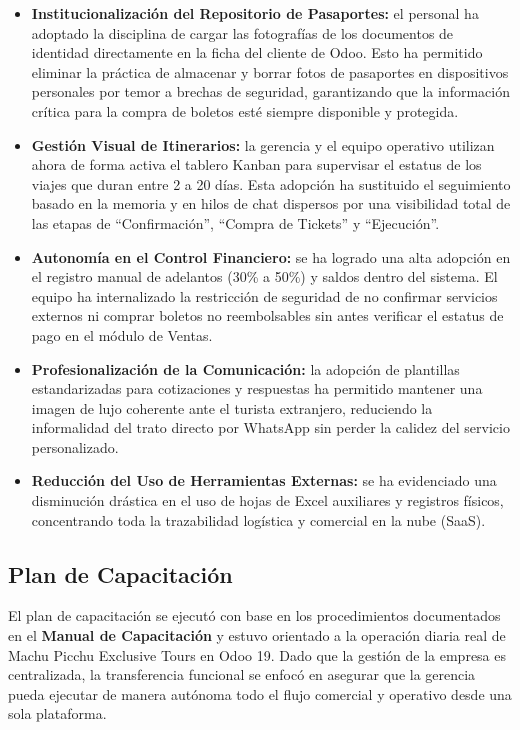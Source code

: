 \begin{itemize}
    \item \textbf{Institucionalización del Repositorio de Pasaportes:} el personal ha adoptado la disciplina de cargar las fotografías de los documentos de identidad directamente en la ficha del cliente de Odoo. Esto ha permitido eliminar la práctica de almacenar y borrar fotos de pasaportes en dispositivos personales por temor a brechas de seguridad, garantizando que la información crítica para la compra de boletos esté siempre disponible y protegida.
    \item \textbf{Gestión Visual de Itinerarios:} la gerencia y el equipo operativo utilizan ahora de forma activa el tablero Kanban para supervisar el estatus de los viajes que duran entre 2 a 20 días. Esta adopción ha sustituido el seguimiento basado en la memoria y en hilos de chat dispersos por una visibilidad total de las etapas de ``Confirmación'', ``Compra de Tickets'' y ``Ejecución''.
    \item \textbf{Autonomía en el Control Financiero:} se ha logrado una alta adopción en el registro manual de adelantos (30\% a 50\%) y saldos dentro del sistema. El equipo ha internalizado la restricción de seguridad de no confirmar servicios externos ni comprar boletos no reembolsables sin antes verificar el estatus de pago en el módulo de Ventas.
    \item \textbf{Profesionalización de la Comunicación:} la adopción de plantillas estandarizadas para cotizaciones y respuestas ha permitido mantener una imagen de lujo coherente ante el turista extranjero, reduciendo la informalidad del trato directo por WhatsApp sin perder la calidez del servicio personalizado.
    \item \textbf{Reducción del Uso de Herramientas Externas:} se ha evidenciado una disminución drástica en el uso de hojas de Excel auxiliares y registros físicos, concentrando toda la trazabilidad logística y comercial en la nube (SaaS).
\end{itemize}

\subsection{Plan de Capacitación}

El plan de capacitación se ejecutó con base en los procedimientos documentados en el
\textbf{Manual de Capacitación} y estuvo orientado a la operación diaria real de Machu Picchu
Exclusive Tours en Odoo 19. Dado que la gestión de la empresa es centralizada, la
transferencia funcional se enfocó en asegurar que la gerencia pueda ejecutar de manera
autónoma todo el flujo comercial y operativo desde una sola plataforma.

